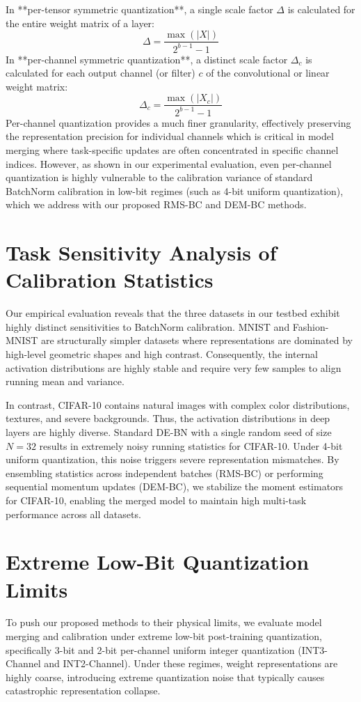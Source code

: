 \documentclass{article}
\begin{document}
In **per-tensor symmetric quantization**, a single scale factor $\Delta$ is calculated for the entire weight matrix of a layer:
\begin{equation}
    \Delta = \frac{\max(|X|)}{2^{b-1} - 1}
\end{equation}
In **per-channel symmetric quantization**, a distinct scale factor $\Delta_c$ is calculated for each output channel (or filter) $c$ of the convolutional or linear weight matrix:
\begin{equation}
    \Delta_c = \frac{\max(|X_c|)}{2^{b-1} - 1}
\end{equation}
Per-channel quantization provides a much finer granularity, effectively preserving the representation precision for individual channels which is critical in model merging where task-specific updates are often concentrated in specific channel indices. However, as shown in our experimental evaluation, even per-channel quantization is highly vulnerable to the calibration variance of standard BatchNorm calibration in low-bit regimes (such as 4-bit uniform quantization), which we address with our proposed RMS-BC and DEM-BC methods.

\section{Task Sensitivity Analysis of Calibration Statistics}
Our empirical evaluation reveals that the three datasets in our testbed exhibit highly distinct sensitivities to BatchNorm calibration. MNIST and Fashion-MNIST are structurally simpler datasets where representations are dominated by high-level geometric shapes and high contrast. Consequently, the internal activation distributions are highly stable and require very few samples to align running mean and variance.

In contrast, CIFAR-10 contains natural images with complex color distributions, textures, and severe backgrounds. Thus, the activation distributions in deep layers are highly diverse. Standard DE-BN with a single random seed of size $N=32$ results in extremely noisy running statistics for CIFAR-10. Under 4-bit uniform quantization, this noise triggers severe representation mismatches. By ensembling statistics across independent batches (RMS-BC) or performing sequential momentum updates (DEM-BC), we stabilize the moment estimators for CIFAR-10, enabling the merged model to maintain high multi-task performance across all datasets.

\section{Extreme Low-Bit Quantization Limits}
To push our proposed methods to their physical limits, we evaluate model merging and calibration under extreme low-bit post-training quantization, specifically 3-bit and 2-bit per-channel uniform integer quantization (INT3-Channel and INT2-Channel). Under these regimes, weight representations are highly coarse, introducing extreme quantization noise that typically causes catastrophic representation collapse.
\end{document}
